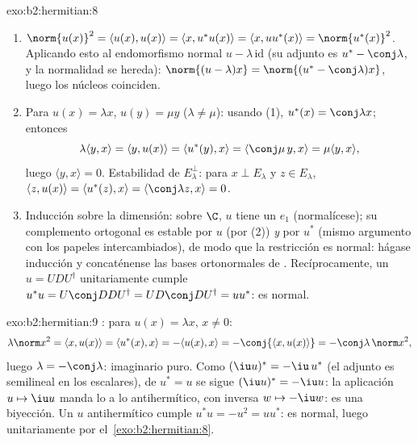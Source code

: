 \begin{solution}{exo:b2:hermitian:8}
\begin{enumerate}
  \item $\norm{u(x)}^2 = \langle u(x), u(x)\rangle = \langle x,
        u^*u(x)\rangle = \langle x, uu^*(x)\rangle =
        \norm{u^*(x)}^2$. Aplicando esto al endomorfismo normal $u
        - \lambda\,\mathrm{id}$ (su adjunto es $u^* -
        \conj\lambda$, y la normalidad se hereda): $\norm{(u -
        \lambda)x} = \norm{(u^* - \conj\lambda)x}$, luego los
        núcleos coinciden.
  \item Para  $u(x) = \lambda x$, $u(y) = \mu y$
        ($\lambda \neq \mu$): usando (1), $u^*(x) = \conj\lambda
        x$; entonces
        \[
        \lambda\langle y, x\rangle = \langle y, u(x)\rangle
        = \langle u^*(y), x\rangle = \langle \conj\mu\, y, x\rangle
        = \mu \langle y, x\rangle ,
        \]
        luego $\langle y, x\rangle = 0$. Estabilidad de
        $E_\lambda^\perp$: para $x \perp E_\lambda$ y $z \in
        E_\lambda$, $\langle z, u(x)\rangle = \langle u^*(z),
        x\rangle = \langle\conj\lambda z, x\rangle = 0$.
  \item Inducción sobre la dimensión: sobre $\C$, $u$ tiene un
         $e_1$ (normalícese); su complemento ortogonal
        es estable por $u$ (por (2)) \emph{y} por $u^*$ (mismo
        argumento con los papeles intercambiados), de modo que la
        restricción es normal: hágase inducción y concaténense las
        bases ortonormales de . Recíprocamente, un
        $u = UDU^\dagger$ unitariamente  cumple $u^*u
        = U\conj D D U^\dagger = U D\conj D U^\dagger = uu^*$: es
        normal.
\end{enumerate}
\end{solution}

\begin{solution}{exo:b2:hermitian:9}
: para $u(x) = \lambda x$, $x \neq 0$:
\[
\lambda\norm x^2 = \langle x, u(x)\rangle
= \langle u^*(x), x\rangle = -\langle u(x), x\rangle
= -\conj{\langle x, u(x)\rangle} = -\conj\lambda\,\norm x^2 ,
\]
luego $\lambda = -\conj\lambda$: imaginario puro. Como $(\iu u)^* =
-\iu\,u^*$ (el adjunto es semilineal en los escalares), de $u^* = u$
se sigue $(\iu u)^* = -\iu u$: la aplicación $u \mapsto \iu u$ manda
lo  a lo antihermítico, con inversa $w \mapsto -\iu w$:
es una biyección. Un $u$ antihermítico cumple $u^*u = -u^2 = uu^*$:
es normal, luego unitariamente  por el~\cref{exo:b2:hermitian:8}.
\end{solution}


